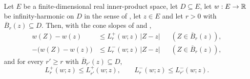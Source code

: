 \begin{lemma}
Let $E$ be a finite-dimensional real inner-product space, let $D\subseteq E$,
let $w:E\to\mathbb{R}$ be infinity-harmonic on $D$ in the sense of
, let $z\in E$ and let $r>0$ with
$\overline B_r(z)\subseteq D$. Then, with the cone slopes of
 and ,
\begin{align}
  w(Z)-w(z)&\le L_r^+(w;z)\,|Z-z| &&(Z\in\overline B_r(z)),
     \label{eq:cone-upper}\\
  -\bigl(w(Z)-w(z)\bigr)&\le L_r^-(w;z)\,|Z-z| &&(Z\in\overline B_r(z)),
     \label{eq:cone-lower}
\end{align}
and for every $r'\ge r$ with $\overline B_{r'}(z)\subseteq D$,
\begin{equation}\label{eq:cone-monotone}
  L_r^+(w;z)\le L_{r'}^+(w;z),\qquad
  L_r^-(w;z)\le L_{r'}^-(w;z).
\end{equation}
\end{lemma}
